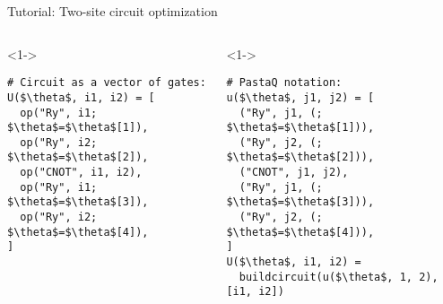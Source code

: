 \begin{frame}[fragile]{Tutorial: Two-site circuit optimization}


\begin{columns}

\begin{column}{5cm}

\begin{onlyenv}<1->

\begin{lstlisting}[language=JuliaLocal, style=julia, mathescape, basicstyle=\small]
# Circuit as a vector of gates:
U($\theta$, i1, i2) = [
  op("Ry", i1; $\theta$=$\theta$[1]),
  op("Ry", i2; $\theta$=$\theta$[2]),
  op("CNOT", i1, i2),
  op("Ry", i1; $\theta$=$\theta$[3]),
  op("Ry", i2; $\theta$=$\theta$[4]),
]


 \end{lstlisting}

\end{onlyenv}


\end{column}

\begin{column}{5cm}

\begin{onlyenv}<1->

\begin{lstlisting}[language=JuliaLocal, style=julia, numbers=none, mathescape, basicstyle=\small]
# PastaQ notation:
u($\theta$, j1, j2) = [
  ("Ry", j1, (; $\theta$=$\theta$[1])),
  ("Ry", j2, (; $\theta$=$\theta$[2])),
  ("CNOT", j1, j2),
  ("Ry", j1, (; $\theta$=$\theta$[3])),
  ("Ry", j2, (; $\theta$=$\theta$[4])),
]
U($\theta$, i1, i2) =
  buildcircuit(u($\theta$, 1, 2), [i1, i2])
\end{lstlisting}

\end{onlyenv}


\end{column}

\end{columns}

\end{frame}
